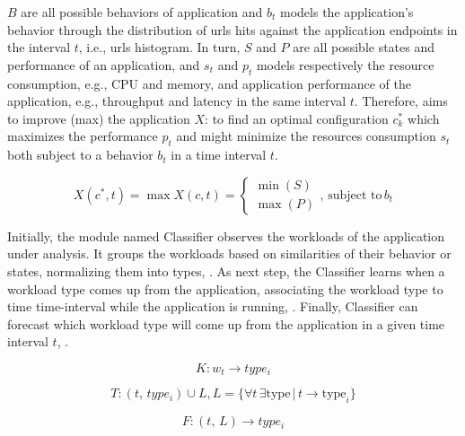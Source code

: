 $B$ are all possible behaviors of application and $b_t$ models the application's behavior through the distribution of
urls hits against the application endpoints in the interval $t$, i.e., urls histogram. In turn, $S$ and $P$ are all
possible states and performance of an application, and $s_t$ and $p_t$ models respectively the resource consumption,
e.g., CPU and memory, and application performance of the application, e.g., throughput and latency in the same interval
$t$. Therefore, \name aims to improve (max) the application $X$: to find an optimal configuration $c^{*}_{k}$ which
maximizes the performance $p_t$ and might minimize the resources consumption $s_t$ both subject to a behavior $b_t$ in
a time interval $t$. 

\begin{equation}
  X(c^{*}, t) = \max{X(c, t)} =
  \begin{cases}
    \min(S) \\
    \max(P)
  \end{cases},\, \text{subject to}\, b_t
  \label{eq:optimization}
\end{equation}

Initially, the module named Classifier observes the workloads of the application under analysis. It groups the
workloads based on similarities of their behavior or states, normalizing them into types, . As next
step, the Classifier learns when a workload type comes up from the application, associating the workload type to time
time-interval while the application is running, . Finally, Classifier can forecast which workload type
will come up from the application in a given time interval $t$, .

\begin{equation}
  K: w_t \rightarrow type_i
  \label{eq:classify}
\end{equation}

\begin{equation}
  T: (t,\, type_i) \cup L, L = \{ \forall t\,\exists \text{type}\, |\, t \rightarrow \text{type}_i \}
  \label{eq:training}
\end{equation}

\begin{equation}
  F: (t, \, L) \rightarrow type_i
  \label{eq:forecast}
\end{equation}

